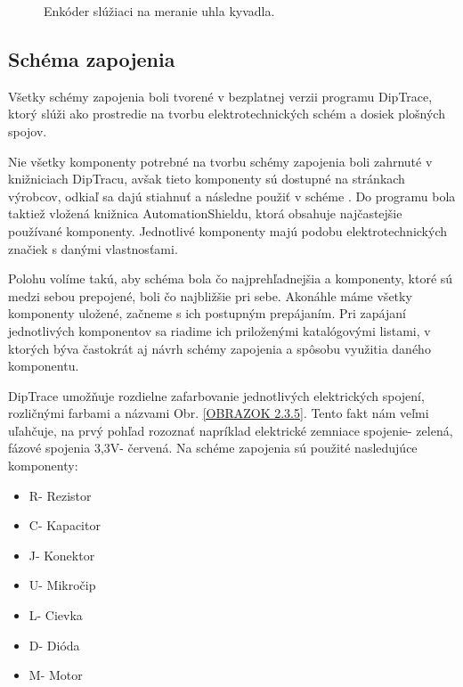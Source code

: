 \begin{figure}[!tbh]
	\hfill
	\hfill
	\hfill
	\caption{Enkóder slúžiaci na meranie uhla kyvadla.}\label{OBRAZOK 2.2}
\end{figure}

\newpage


\subsection{Schéma zapojenia}

Všetky schémy zapojenia boli tvorené v bezplatnej verzii programu DipTrace, ktorý slúži ako prostredie na tvorbu elektrotechnických schém a dosiek plošných spojov. 

Nie všetky komponenty potrebné na tvorbu schémy zapojenia boli zahrnuté v knižniciach DipTracu, avšak tieto komponenty sú dostupné na stránkach výrobcov, odkiaľ sa dajú stiahnuť a následne použiť v schéme \cite{AS5600Downl}\cite{TPS56339Downl}\cite{INAobr}. Do programu bola taktiež vložená knižnica AutomationShieldu, ktorá obsahuje najčastejšie používané komponenty. Jednotlivé komponenty majú podobu elektrotechnických značiek s danými vlastnosťami. 

Polohu volíme takú, aby schéma bola čo najprehľadnejšia a komponenty, ktoré sú medzi sebou prepojené, boli čo najbližšie pri sebe. Akonáhle máme všetky komponenty uložené, začneme s ich postupným prepájaním. Pri zapájaní jednotlivých komponentov sa riadime ich priloženými katalógovými listami, v ktorých býva častokrát aj návrh schémy zapojenia a spôsobu využitia daného komponentu.

DipTrace umožňuje rozdielne zafarbovanie jednotlivých elektrických spojení, rozličnými farbami a názvami Obr. \ref{OBRAZOK 2.3.5}. Tento fakt nám veľmi uľahčuje, na prvý pohľad rozoznať napríklad elektrické zemniace spojenie- zelená, fázové spojenia 3,3V- červená. Na schéme zapojenia sú použité nasledujúce komponenty:
\begin{multicols}{3}
	\begin{itemize}
		\item R- Rezistor
		\item C- Kapacitor
		\item J- Konektor
		\item U- Mikročip
		\item L- Cievka
		\item D- Dióda
		\item M- Motor
	\end{itemize}
\end{multicols}


